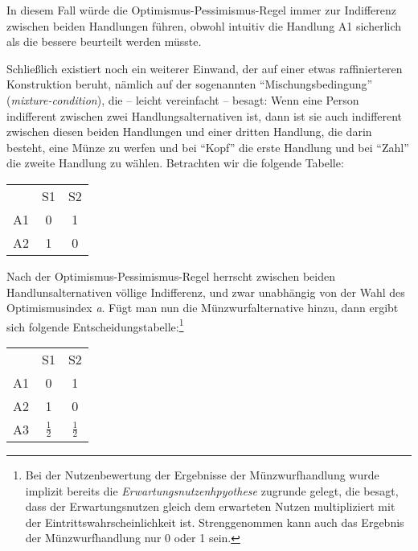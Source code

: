 In diesem Fall würde die Optimismus-Pessimismus-Regel immer zur Indifferenz
zwischen beiden Handlungen führen, obwohl intuitiv die Handlung A1 sicherlich
als die bessere beurteilt werden müsste. 

Schließlich existiert noch ein weiterer Einwand, der auf einer etwas
raffinierteren Konstruktion beruht, nämlich auf der sogenannten
"`Mischungsbedingung"' ({\em mixture-condition}),
 die -- leicht vereinfacht --
besagt: Wenn eine Person indifferent zwischen zwei Handlungsalternativen ist,
dann ist sie auch indifferent zwischen diesen beiden Handlungen und einer dritten
Handlung, die darin besteht, eine Münze zu werfen und bei "`Kopf"' die erste
Handlung und bei "`Zahl"' die zweite Handlung zu wählen. Betrachten wir die
folgende Tabelle:

\begin{center}
\begin{tabular}{c|c|c|}
\multicolumn{1}{c}{}  & \multicolumn{1}{c}{S1}  & \multicolumn{1}{c}{S2} 
\\ \cline{2-3}
 A1 & 0 & 1 \\ \cline{2-3}
 A2 & 1 & 0 \\ \cline{2-3}
\end{tabular}
\end{center}

Nach der Optimismus-Pessimismus-Regel herrscht zwischen beiden
Handlunsalternativen völlige Indifferenz, und zwar unabhängig von der Wahl des
Optimismusindex {\em a}. Fügt man nun die Münzwurfalternative hinzu, dann
ergibt sich folgende Entscheidungstabelle:\footnote{Bei der Nutzenbewertung der
Ergebnisse der Münzwurfhandlung wurde implizit bereits die {\em
Erwartungsnutzenhpyothese} zugrunde gelegt, die besagt, dass der
Erwartungsnutzen gleich dem erwarteten Nutzen multipliziert mit der
Eintrittswahrscheinlichkeit ist. Strenggenommen kann auch das Ergebnis der
Münzwurfhandlung nur 0 oder 1 sein.}

\begin{center}
\begin{tabular}{c|c|c|}
\multicolumn{1}{c}{}  & \multicolumn{1}{c}{S1}  & \multicolumn{1}{c}{S2} 
\\ \cline{2-3}
 A1 & 0 & 1 \\ \cline{2-3}
 A2 & 1 & 0 \\ \cline{2-3}
 A3 & $\frac{1}{2}$ & $\frac{1}{2}$ \\ \cline{2-3}
\end{tabular}
\end{center}

